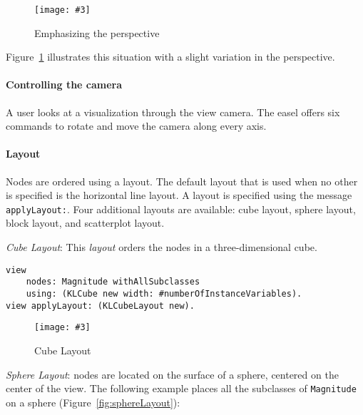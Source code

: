 \documentclass{sig-alternate}
\newcommand{\ct}{\lstinline[backgroundcolor=\color{white},basicstyle=\footnotesize\ttfamily]}
\newcommand{\fig}[4]{
	\begin{figure}[#1]
		\centering
		\texttt{[image: \#3]}
		\caption{\label{fig:#3}#4}
	\end{figure}}
\newcommand{\figref}[1]{Figure~\ref{fig:#1}}
\begin{document}
\fig{h}{0.5}{perspective}{Emphasizing the perspective}

\figref{perspective} illustrates this situation with a slight variation in the perspective.

\paragraph{Controlling the camera}
A user looks at a visualization through the view camera. The easel offers six commands to rotate and move the camera along every axis. 
%   

\paragraph{Layout}
Nodes are ordered using a layout. The default layout that is used when no other is specified is the horizontal line layout. A layout is specified using the message \ct{applyLayout:}. Four additional layouts are available: cube layout, sphere layout, block layout, and scatterplot layout.

\emph{Cube Layout}: This \emph{layout} orders the nodes in a three-dimensional cube.


\begin{lstlisting}
view 
	nodes: Magnitude withAllSubclasses 
	using: (KLCube new width: #numberOfInstanceVariables).
view applyLayout: (KLCubeLayout new). 
\end{lstlisting}
\fig{}{0.3}{cubeLayout}{Cube Layout}

\emph{Sphere Layout}: nodes are located on the surface of a sphere, centered on the center of the view. The following example places all the subclasses of \ct{Magnitude} on a sphere (\figref{sphereLayout}):
\end{document}
